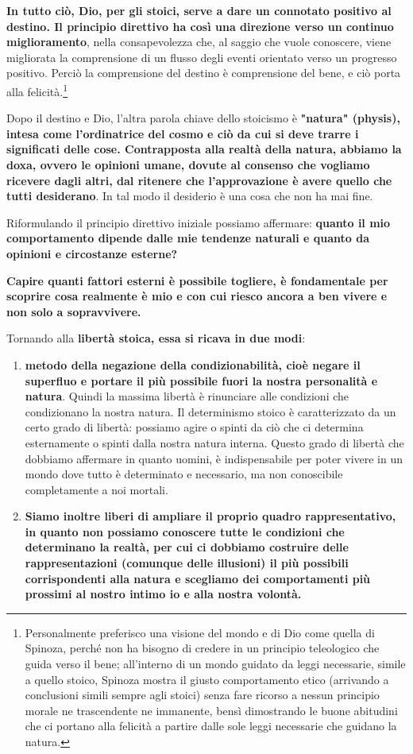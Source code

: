 \documentclass[a4paper,12pt,oneside]{article}%
\begin{document}
\textbf{In tutto ciò,  Dio, per gli stoici, serve a dare un connotato positivo al destino. Il principio direttivo ha così una direzione verso un continuo miglioramento}, nella consapevolezza che, al saggio che vuole conoscere, viene migliorata la comprensione di un flusso degli eventi orientato verso un progresso positivo. Perciò la comprensione del destino è comprensione del bene, e ciò porta alla felicità.\footnote{Personalmente preferisco una visione del mondo e di Dio come quella di Spinoza, perché non ha bisogno di credere in un principio teleologico che guida verso il bene; all'interno di un mondo guidato da leggi necessarie, simile a quello stoico, Spinoza mostra il giusto comportamento etico (arrivando a conclusioni simili sempre agli stoici) senza fare ricorso a nessun principio morale ne trascendente ne immanente, bensì dimostrando le buone abitudini che ci portano alla felicità a partire dalle sole leggi necessarie che guidano la natura. }

Dopo il destino e Dio, l'altra parola chiave dello stoicismo è \textbf{"natura" (physis), intesa come l'ordinatrice del cosmo e ciò da cui si deve trarre i significati delle cose. Contrapposta alla realtà della natura, abbiamo la doxa, ovvero le opinioni umane, dovute al consenso che vogliamo ricevere dagli altri, dal ritenere che l'approvazione è avere quello che tutti desiderano}. In tal modo il desiderio è una cosa che non ha mai fine.

Riformulando il principio direttivo iniziale possiamo affermare:\textbf{ quanto il mio comportamento dipende dalle mie tendenze naturali e quanto da opinioni e circostanze esterne?}

\textbf{Capire quanti fattori esterni è possibile togliere, è fondamentale per scoprire cosa realmente è mio e con cui riesco ancora a ben vivere e non solo a sopravvivere.}

Tornando alla \textbf{libertà stoica, essa si ricava in due modi}:

\begin{enumerate}
	\item \textbf{metodo della negazione della condizionabilità, cioè negare il superfluo e portare il più possibile fuori la nostra personalità e natura}. Quindi la massima libertà è rinunciare alle condizioni che condizionano la nostra natura. Il determinismo stoico  è caratterizzato da un certo grado di libertà: possiamo agire o spinti da ciò che ci determina esternamente o spinti dalla nostra natura interna. Questo grado di libertà che dobbiamo affermare in quanto uomini, è indispensabile per poter vivere in un mondo dove tutto è determinato e necessario, ma non conoscibile completamente a noi mortali.
	
	\item \textbf{Siamo inoltre liberi di ampliare il proprio quadro rappresentativo, in quanto non possiamo conoscere tutte le condizioni che determinano la realtà, per cui ci dobbiamo costruire delle  rappresentazioni (comunque delle illusioni) il più possibili corrispondenti alla natura e scegliamo dei comportamenti più prossimi al nostro intimo io e alla nostra volontà. }
\end{enumerate}
\end{document}
